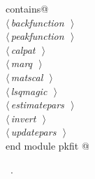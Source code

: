 \documentclass[10pt,a4paper,notitlepage]{article}
\begin{document}
\begin{flushleft}
\begin{minipage}{\linewidth}
\begin{list}{}{}
\mbox{}\verb@      contains@\\
\mbox{}\verb@@\hbox{$\langle\,${\it backfunction}\nobreak\ {\footnotesize {}}$\,\rangle$}\verb@@\\
\mbox{}\verb@@\hbox{$\langle\,${\it peakfunction}\nobreak\ {\footnotesize {}}$\,\rangle$}\verb@@\\
\mbox{}\verb@@\hbox{$\langle\,${\it calpat}\nobreak\ {\footnotesize {}}$\,\rangle$}\verb@@\\
\mbox{}\verb@@\hbox{$\langle\,${\it marq}\nobreak\ {\footnotesize {}}$\,\rangle$}\verb@@\\
\mbox{}\verb@@\hbox{$\langle\,${\it matscal}\nobreak\ {\footnotesize {}}$\,\rangle$}\verb@@\\
\mbox{}\verb@@\hbox{$\langle\,${\it lsqmagic}\nobreak\ {\footnotesize {}}$\,\rangle$}\verb@@\\
\mbox{}\verb@@\hbox{$\langle\,${\it estimatepars}\nobreak\ {\footnotesize {}}$\,\rangle$}\verb@@\\
\mbox{}\verb@@\hbox{$\langle\,${\it invert}\nobreak\ {\footnotesize {}}$\,\rangle$}\verb@@\\
\mbox{}\verb@@\hbox{$\langle\,${\it updatepars}\nobreak\ {\footnotesize {}}$\,\rangle$}\verb@@\\
\mbox{}\verb@       end module pkfit                       @{\NWsep}
\end{list}
\vspace{-1.5ex}
\footnotesize
\begin{list}{}{\setlength{\itemsep}{-\parsep}\setlength{\itemindent}{-\leftmargin}}
\item \NWtxtMacroRefIn\ .

\item{}
\end{list}
\end{minipage}\vspace{4ex}
\end{flushleft}
\end{document}
